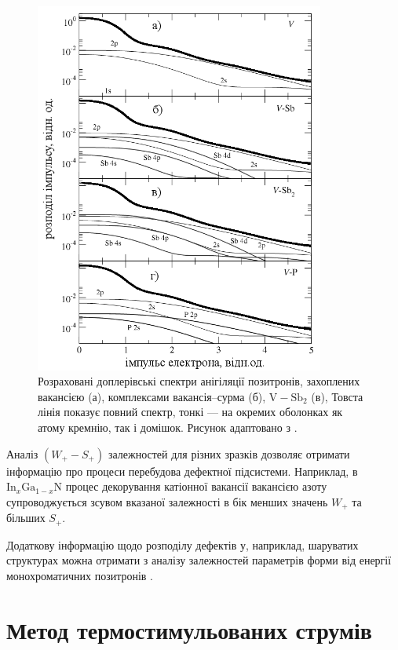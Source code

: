 \documentclass[10pt,a5paper,titlepage,oneside]{book}
\numberwithin{equation}{part}
\begin{document}
\begin{figure}[!b]
\center
\vspace{-5mm}
\includegraphics[width=0.85\textwidth]{Fig3_6}
\vspace{-3mm}
\caption{Розраховані доплерівські
спектри анігіляції позитронів, захоплених 
вакансією (а), комплексами вакансія--сурма (б),
$\mbox{V}-\mbox{Sb}_2$ (в),
Товста лінія показує повний спектр,
тонкі --- на окремих оболонках як атому кремнію,
так і домішок.
Рисунок адаптовано з \cite{PAS}.
}
\vspace{-3mm}
\label{F36}
\end{figure}

Аналіз $(W_+-S_+)$ залежностей для різних зразків
дозволяє отримати інформацію про процеси перебудова дефектної підсистеми.
Наприклад, в $\text{In}_x\text{Ga}_{1-x}\text{N}$
процес декорування катіонної вакансії
вакансією азоту супроводжується зсувом вказаної залежності в бік
менших значень $W_+$ та більших $S_+$.



Додаткову інформацію щодо розподілу дефектів
у, наприклад, шаруватих структурах
можна отримати з аналізу залежностей параметрів
форми від енергії монохроматичних позитронів \cite{Uedono_2014}.

\chapter{Метод термостимульованих струмів}\label{chapTSC}



\end{document}
